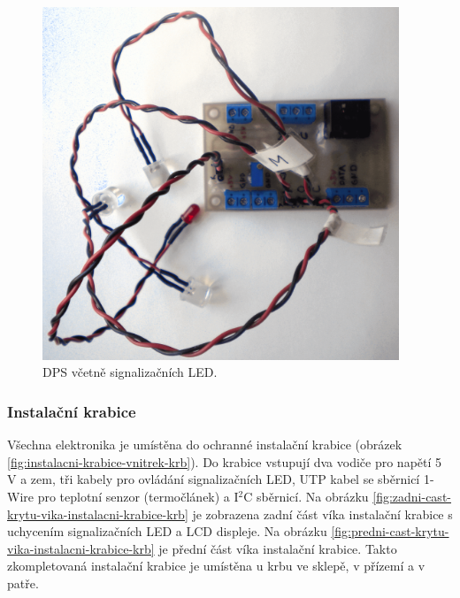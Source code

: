 \begin{figure}[H]
    \centering
    \includegraphics[width=0.95\textwidth]{images/krb/dps-led-ochrany-u-krbu-kabely.png}
    \caption{DPS včetně signalizačních LED.}
    \label{fig:dps-led-ochrany-u-krbu-kabely}
\end{figure}

\subsubsection{Instalační krabice}
Všechna elektronika je umístěna do ochranné instalační krabice (obrázek \ref{fig:instalacni-krabice-vnitrek-krb}). Do krabice vstupují dva vodiče pro napětí 5 V a zem, tři kabely pro ovládání signalizačních LED, UTP kabel se sběrnicí 1-Wire pro teplotní senzor (termočlánek) a I$^2$C sběrnicí. Na obrázku \ref{fig:zadni-cast-krytu-vika-instalacni-krabice-krb} je zobrazena zadní část víka instalační krabice s uchycením signalizačních LED a LCD displeje. Na obrázku \ref{fig:predni-cast-krytu-vika-instalacni-krabice-krb} je přední část víka instalační krabice. Takto zkompletovaná instalační krabice je umístěna u krbu ve sklepě, v přízemí a v patře.

